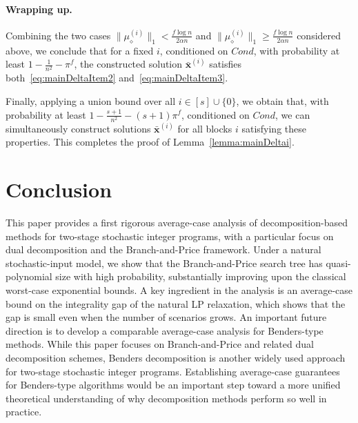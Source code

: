 \documentclass{article}
\newcommand{\xv}[0]{\mathbf{x}}
\newcommand{\normm}[1]{\big\lVert#1\big\rVert}
\begin{document}
\paragraph{Wrapping up.}
Combining the two cases
$\normm{\mu_{\diamond}^{(i)}}_1 < \frac{f \log n}{2\alpha n}$ and
$\normm{\mu_{\diamond}^{(i)}}_1 \ge \frac{f \log n}{2\alpha n}$ considered above,
we conclude that for a fixed $i$, conditioned on $Cond$, with probability at
least $1 - \frac{1}{n^2} - \pi^f$, the constructed solution
$\bar{\xv}^{(i)}$ satisfies both~\eqref{eq:mainDeltaItem2}
and~\eqref{eq:mainDeltaItem3}.

Finally, applying a union bound over all $i \in [s] \cup \{0\}$, we obtain that,
with probability at least
$1 - \frac{s+1}{n^2} - (s+1)\pi^f$, conditioned on $Cond$, we can simultaneously
construct solutions $\bar{\xv}^{(i)}$ for all blocks $i$ satisfying these
properties.
This completes the proof of Lemma~\ref{lemma:mainDeltai}.


\section{Conclusion}

This paper provides a first rigorous average-case analysis of decomposition-based methods for two-stage stochastic integer programs, with a particular focus on dual decomposition and the Branch-and-Price framework. Under a natural stochastic-input model, we show that the Branch-and-Price search tree has quasi-polynomial size with high probability, substantially improving upon the classical worst-case exponential bounds. A key ingredient in the analysis is an average-case bound on the integrality gap of the natural LP relaxation, which shows that the gap is small even when the number of scenarios grows.
An important future direction is to develop a comparable average-case analysis for Benders-type methods. While this paper focuses on Branch-and-Price and related dual decomposition schemes, Benders decomposition is another widely used approach for two-stage stochastic integer programs. Establishing average-case guarantees for Benders-type algorithms would be an important step toward a more unified theoretical understanding of why decomposition methods perform so well in practice.

\clearpage

\appendix
{}
\end{document}
